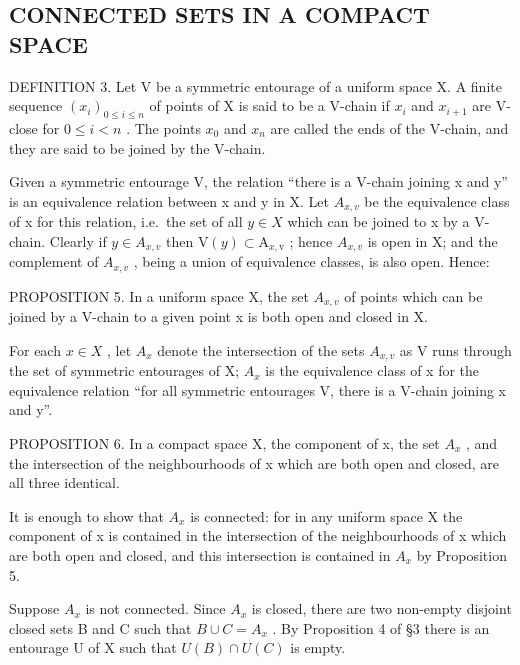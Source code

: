\subsection{CONNECTED SETS IN A COMPACT SPACE}

DEFINITION 3. Let V be a symmetric entourage of a uniform space X. A finite sequence \((x_{i})_{0\leqslant i\leqslant n}\) of points of X is said to be a V-chain if \(x_{i}\) and \(x_{i+1}\) are V-close for \(0\leqslant i<n\) . The points \(x_{0}\) and \(x_{n}\) are called the ends of the V-chain, and they are said to be joined by the V-chain.

Given a symmetric entourage V, the relation ``there is a V-chain joining x and y'' is an equivalence relation between x and y in X. Let \(A_{x,v}\) be the equivalence class of x for this relation, i.e.~the set of all \(y \in X\) which can be joined to x by a V-chain. Clearly if \(y \in A_{x,v}\) then \(\mathrm{V}(y) \subset \mathrm{A}_{x,\mathrm{v}}\) ; hence \(A_{x,v}\) is open in X; and the complement of \(A_{x,v}\) , being a union of equivalence classes, is also open. Hence:

PROPOSITION 5. In a uniform space X, the set \(A_{x,v}\) of points which can be joined by a V-chain to a given point x is both open and closed in X.

For each \(x \in X\) , let \(A_{x}\) denote the intersection of the sets \(A_{x,v}\) as V runs through the set of symmetric entourages of X; \(A_{x}\) is the equivalence class of x for the equivalence relation ``for all symmetric entourages V, there is a V-chain joining x and y''.

PROPOSITION 6. In a compact space X, the component of x, the set \(A_{x}\) , and the intersection of the neighbourhoods of x which are both open and closed, are all three identical.

It is enough to show that \(A_{x}\) is connected: for in any uniform space X the component of x is contained in the intersection of the neighbourhoods of x which are both open and closed, and this intersection is contained in \(A_{x}\) by Proposition 5.

Suppose \(A_{x}\) is not connected. Since \(A_{x}\) is closed, there are two non-empty disjoint closed sets B and C such that \(B \cup C = A_{x}\) . By Proposition 4 of §3 there is an entourage U of X such that \(U(B) \cap U(C)\) is empty.

